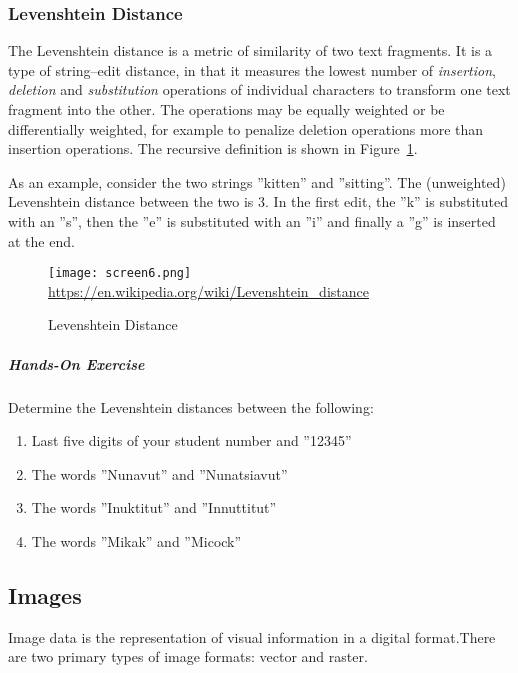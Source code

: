 \subsubsection*{Levenshtein Distance}

The Levenshtein distance is a metric of similarity of two text fragments. It is a type of string--edit distance, in that it measures the lowest number of \emph{insertion}, \emph{deletion} and \emph{substitution} operations of individual characters to transform one text fragment into the other. The operations may be equally weighted or be differentially weighted, for example to penalize deletion operations more than insertion operations. The recursive definition is shown in Figure~\ref{fig:levenshtein}. 

As an example, consider the two strings ''kitten'' and ''sitting''. The (unweighted) Levenshtein distance between the two is 3. In the first edit, the ''k'' is substituted with an ''s'', then the ''e'' is substituted with an ''i'' and finally a ''g'' is inserted at the end.

\begin{figure}
\centering
\texttt{[image: screen6.png]} \\

\scriptsize
\url{https://en.wikipedia.org/wiki/Levenshtein_distance}
\caption{Levenshtein Distance}
\label{fig:levenshtein}
\end{figure}


\begin{tcolorbox}[colback=code]
\subparagraph*{Hands-On Exercise} 
Determine the Levenshtein distances between the following:
\begin{enumerate}
  \item Last five digits of your student number and ''12345''
  \item The words ''Nunavut'' and ''Nunatsiavut''
  \item The words ''Inuktitut'' and ''Innuttitut''
  \item The words ''Mikak'' and ''Micock''
\end{enumerate}
\end{tcolorbox}


\subsection*{Images}

Image data is the representation of visual information in a digital format.There are two primary types of image formats: vector and raster. 

